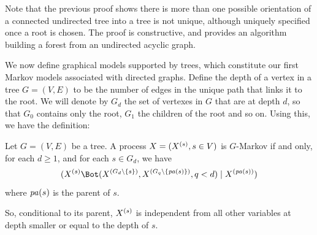 Note that the previous proof shows there is more than one possible orientation of a connected
undirected tree into a tree is not unique, although uniquely specified
once a root is chosen. The proof is constructive, and provides an algorithm building a forest from an undirected acyclic graph.

We now define graphical models supported by trees, which constitute
our first Markov models associated with directed graphs. Define the
depth of a vertex in a tree $G = (V,E)$ to be the number of edges in the unique
path that links it to the root. We will denote by $G_d$ the set of
vertexes in $G$ that are at depth $d$, so that $G_0$
contains only the root, $G_1$ the children of the root and so on. Using
this, we have the definition: 
\begin{definition}
\label{def:tree.x}
Let $G = (V,E)$ be a tree. A process $X = (X^{(s)}, s\in V)$ is
$G$-Markov if and only, for each $d\geq 1$, and for each $s\in G_d$,
we have
\begin{equation}
\label{eq:tree.cond}
\cind{\pe Xs}{(\pe X{G_d\setm\{s\}}, \pe X{G_q\setm\{\pa{s}\}}, q<d)}{\pe X{\pa{s}}}
\end{equation}
where ${\mathit{pa}(s)}$ is the parent of $s$.
\end{definition}
So, conditional to its parent, $X^{(s)}$ is independent from all other
variables at depth smaller or equal to the depth of $s$. 
 
